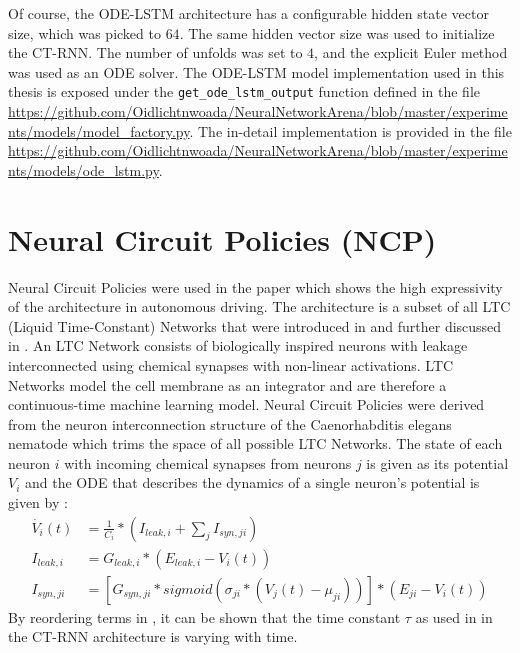 \documentclass[draft,final]{vutinfth} %
\begin{document}
    Of course, the ODE-LSTM architecture has a configurable hidden state vector size, which was picked to $64$.
    The same hidden vector size was used to initialize the CT-RNN. The number of unfolds was set to $4$, and the explicit Euler method was used as an ODE solver.
    The ODE-LSTM model implementation used in this thesis is exposed under the \texttt{get\_ode\_lstm\_output} function defined in the file \url{https://github.com/Oidlichtnwoada/NeuralNetworkArena/blob/master/experiments/models/model_factory.py}.
    The in-detail implementation is provided in the file \url{https://github.com/Oidlichtnwoada/NeuralNetworkArena/blob/master/experiments/models/ode_lstm.py}.


    \section{Neural Circuit Policies (NCP)} \label{ncp}
    Neural Circuit Policies were used in the paper \cite{NCP} which shows the high expressivity of the architecture in autonomous driving.
    The architecture is a subset of all LTC (Liquid Time-Constant) Networks that were introduced in \cite{LTCFormulas} and further discussed in \cite{LTCNetworks}.
    An LTC Network consists of biologically inspired neurons with leakage interconnected using chemical synapses with non-linear activations.
    LTC Networks model the cell membrane as an integrator and are therefore a continuous-time machine learning model.
    Neural Circuit Policies were derived from the neuron interconnection structure of the Caenorhabditis elegans nematode \cite[p. 3]{NCP} which trims the space of all possible LTC Networks.
    The state of each neuron $i$ with incoming chemical synapses from neurons $j$ is given as its potential $V_i$ and the ODE that describes the dynamics of a single neuron's potential is given by \cite[p. 1-2]{LTCFormulas}:
    \begin{align}
        \label{ltc_formula}
        \dot{V_i}(t) &= \frac{1}{C_i} * (I_{leak,i} + \sum_j{I_{syn,ji}}) \\
        \label{leakage_current}
        I_{leak,i} &= G_{leak,i} * (E_{leak,i} - V_i(t)) \\
        \label{synaptic_current}
        I_{syn,ji} &= [G_{syn,ji} * sigmoid(\sigma_{ji}*(V_j(t)-\mu_{ji}))] * (E_{ji} - V_i(t))
    \end{align}
    By reordering terms in , it can be shown that the time constant $\tau$ as used in  in the CT-RNN architecture is varying with time.
\end{document}
